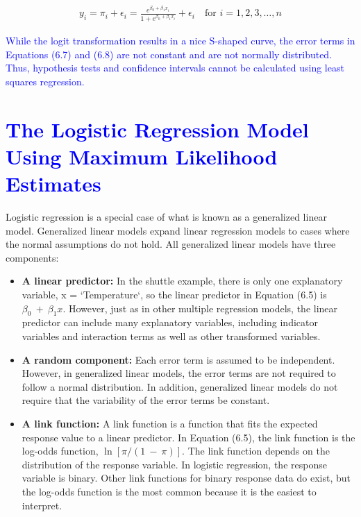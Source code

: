 \documentclass[
]{report}
\begin{document}
\begin{align}
y_i = \pi_i + \epsilon_i  = \frac{e^{\beta_0 + \beta_1 x_i}}{1 + e^{\beta_0 + \beta_1 x_i}} + \epsilon_i \quad \text{for } i = 1,2,3,\dots,n 
    \tag{6.8}
\end{align}

\textcolor{blue}{While the logit transformation results in a nice S-shaped curve, the error terms in Equations (6.7) and (6.8) are not constant and are not normally distributed. Thus, hypothesis tests and confidence intervals cannot be calculated using least squares regression.}

\hypertarget{section-63}{%
\section{\texorpdfstring{\textcolor{blue}{ The Logistic Regression Model Using Maximum Likelihood Estimates}}{}}\label{section-63}}

Logistic regression is a special case of what is known as a generalized linear model. Generalized linear models expand linear regression models to cases where the normal assumptions do not hold. All generalized linear models have three components:

\begin{itemize}
  \item \textbf{A linear predictor:} In the shuttle example, there is only one explanatory variable, x = `Temperature`, so the linear predictor in Equation (6.5) is $\scriptstyle \beta_0 \ +\  \beta_1 x$. However, just as in other multiple regression models, the linear predictor can include many explanatory variables, including indicator variables and interaction terms as well as other transformed variables.
  \item \textbf{A random component:} Each error term is assumed to be independent. However, in generalized linear models, the error terms are not required to follow a normal distribution. In addition, generalized linear models do not require that the variability of the error terms be constant.
  \item \textbf{A link function:} A link function is a function that fits the expected response value to a linear predictor. In Equation (6.5), the link function is the log-odds function, $\scriptstyle \ln[\pi/(1 \ -\  \pi)]$. The link function depends on the distribution of the response variable. In logistic regression, the response variable is binary. Other link functions for binary response data do exist, but the log-odds function is the most common because it is the easiest to interpret.
\end{itemize}
\end{document}

